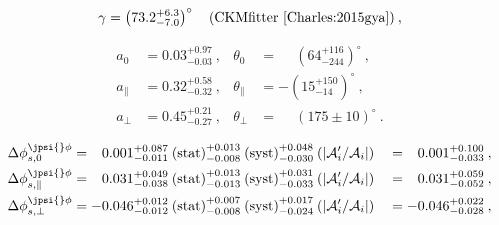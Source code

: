 

%
\begin{equation}\label{Eq:Gamma_GC}
\gamma  = \left(73.2_{-7.0}^{+6.3}\right)^{\circ} \quad\text{(CKMfitter \cite{Charles:2015gya})}\:,
\end{equation}


\begin{align}
a_0 & = 0.03^{+0.97}_{-0.03}\:, & \theta_0 & = \phantom{-}\left(64^{+116}_{-244}\right)^{\circ}\:,\\
%
a_\parallel & = 0.32^{+0.58}_{-0.32}\:, & \theta_\parallel & = -\left(15^{+150}_{-14}\right)^{\circ}\:,\\
%
a_\perp & = 0.45^{+0.21}_{-0.27}\:, & \theta_\perp & = \phantom{-}\left(175 \pm 10\right)^{\circ}\:.
\end{align}



\begin{alignat}{2}
\Delta\phi^{\jpsi{}\phi}_{s,0} & =
\phantom{-}0.001^{+0.087}_{-0.011}\:\text{(stat)}^{+0.013}_{-0.008}\:\text{(syst)}^{+0.048}_{-0.030}\:(|\mathcal{A}'_i/\mathcal{A}_i|)
&& = \phantom{-}0.001^{+0.100}_{-0.033}\:,\\
%
\Delta\phi^{\jpsi{}\phi}_{s,\parallel} & =
\phantom{-}0.031^{+0.049}_{-0.038}\:\text{(stat)}^{+0.013}_{-0.013}\:\text{(syst)}^{+0.031}_{-0.033}\:(|\mathcal{A}'_i/\mathcal{A}_i|)
&& = \phantom{-}0.031^{+0.059}_{-0.052}\:,\\
%
\Delta\phi^{\jpsi{}\phi}_{s,\perp} & =
-0.046^{+0.012}_{-0.012}\:\text{(stat)}^{+0.007}_{-0.008}\:\text{(syst)}^{+0.017}_{-0.024}\:(|\mathcal{A}'_i/\mathcal{A}_i|)
&& = -0.046^{+0.022}_{-0.028}\:,
\end{alignat}


